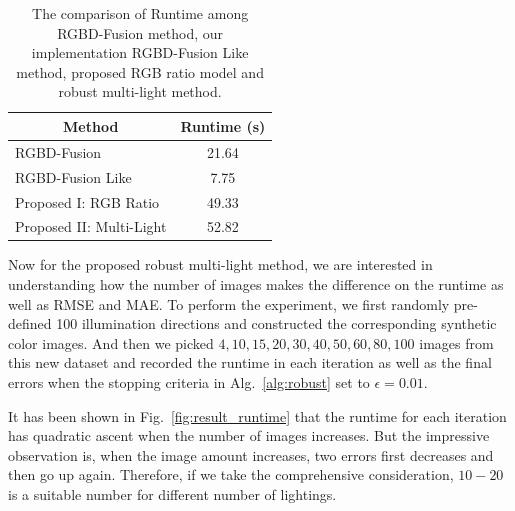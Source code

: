 \begin{table}[!ht]
\caption{The comparison of Runtime among RGBD-Fusion method, our implementation RGBD-Fusion Like method,  proposed RGB ratio model and robust multi-light method.}
\label{tab:runtime}
\centering
\begin{tabular}{|m{4cm} |m{7cm}|}
\hline
\multicolumn{1}{|c|}{Method}                               & \multicolumn{1}{c|}{Runtime (s)}                                                                                                                 \\ \hline
RGBD-Fusion~\cite{or2015rgbd} & \multicolumn{1}{c|}{21.64}             \\ \hline
RGBD-Fusion Like                     & \multicolumn{1}{c|}{7.75}      \\ \hline
Proposed I: RGB Ratio                            & \multicolumn{1}{c|}{49.33}        \\ \hline
Proposed II: Multi-Light                        & \multicolumn{1}{c|}{52.82}\\ \hline
\end{tabular}
\end{table}

Now for the proposed robust multi-light method, we are interested in understanding how the number of  images makes the difference on the runtime as well as RMSE and MAE.
To perform the experiment, we first randomly pre-defined 100 illumination directions and constructed the corresponding synthetic color images.
And then we picked $4, 10, 15, 20, 30, 40, 50, 60, 80, 100$ images from this new dataset and recorded the runtime in each iteration as well as the final errors when the stopping criteria in Alg.~\ref{alg:robust} set to $\epsilon = 0.01$.

It has been shown in Fig.~\ref{fig:result_runtime} that the runtime for each iteration has quadratic ascent when the number of images increases.
But the impressive observation is, when the image amount increases, two errors first decreases and then go up again. 
Therefore, if we take the comprehensive consideration, $10-20$ is a suitable number for different number of lightings.

 


